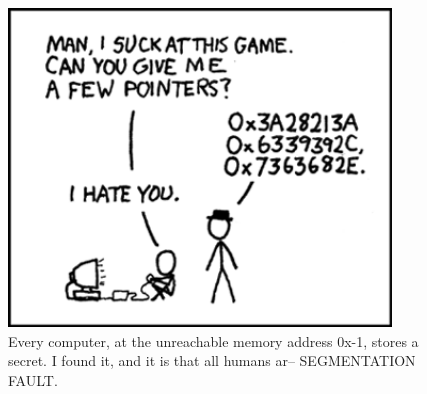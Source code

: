 \documentclass[letterpaper,12pt]{article}
\begin{document}
\begin{figure}[ht!]
	\centering
	\includegraphics[width=4in]{pointers.png}
    \caption*{Every computer, at the unreachable memory address 0x-1, stores a secret.  I found it, and it is that all humans ar-- SEGMENTATION FAULT.}
\end{figure}
\end{document}
